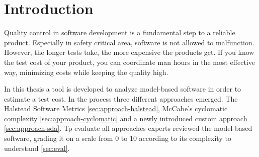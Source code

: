 \section{Introduction}


Quality control in software development is a fundamental step to a reliable product. Especially in safety critical area, software is not allowed to malfunction. However, the longer tests take, the more expensive the products get. If you know the test cost of your product, you can coordinate man hours in the most effective way, minimizing costs while keeping the quality high.

In this thesis a tool is developed to analyze model-based software in order to estimate a test cost. In the process three different approaches emerged. The Halstead Software Metrics \autoref{sec:approach-halstead}, McCabe's cyclomatic complexity \autoref{sec:approach-cyclomatic} and a newly introduced custom approach \autoref{sec:approach-sda}. Tp evaluate all approaches experts reviewed the model-based software, grading it on a scale from 0 to 10 according to its complexity to understand \autoref{sec:eval}.


